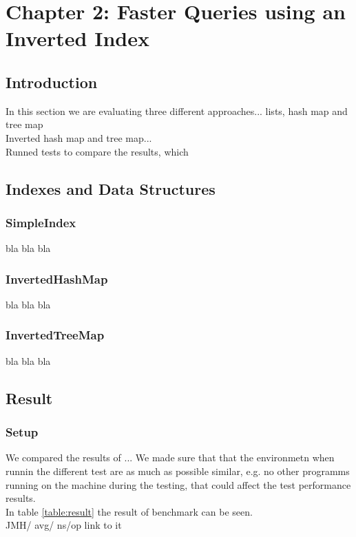 \chapter{Chapter 2: Faster Queries using an Inverted Index}


\section{Introduction}
In this section we are evaluating three different approaches... lists, hash map and tree map \\
Inverted hash map and tree map...\\
Runned tests to compare the results, which \\

\section{Indexes and Data Structures}
\subsection{SimpleIndex}
bla bla bla
\subsection{InvertedHashMap}
bla bla bla \cite{oracle:hashmap}
\subsection{InvertedTreeMap}
bla bla bla


\section{Result}

\subsection{Setup}
We compared the results of ...
We made sure that that the environmetn when runnin the different test are as much as possible similar, e.g. no other programms running on the machine during the testing, that could affect the test performance results.\\
In table \ref{table:result} the result of benchmark can be seen.\\
JMH/ avg/ ns/op
link to it


